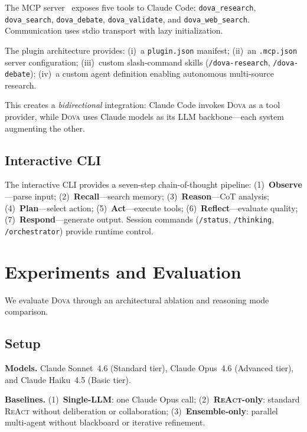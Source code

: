 \documentclass{article}
\theoremstyle{plain}
\theoremstyle{definition}
\newcommand{\dova}{\textsc{Dova}}
\newcommand{\react}{\textsc{ReAct}}
\begin{document}
The MCP server~\citep{anthropic2024mcp} exposes five tools to Claude Code:
\texttt{dova\_research}, \texttt{dova\_search}, \texttt{dova\_debate},
\texttt{dova\_validate}, and \texttt{dova\_web\_search}.  Communication uses
stdio transport with lazy initialization.

The plugin architecture provides:
(i)~a \texttt{plugin.json} manifest;
(ii)~an \texttt{.mcp.json} server configuration;
(iii)~custom slash-command skills (\texttt{/dova-research},
\texttt{/dova-debate});
(iv)~a custom agent definition enabling autonomous multi-source research.

This creates a \emph{bidirectional} integration: Claude Code invokes \dova{}
as a tool provider, while \dova{} uses Claude models as its LLM
backbone---each system augmenting the other.

\subsection{Interactive CLI}\label{sec:cli}

The interactive CLI provides a seven-step chain-of-thought pipeline:
(1)~\textbf{Observe}---parse input;
(2)~\textbf{Recall}---search memory;
(3)~\textbf{Reason}---CoT analysis;
(4)~\textbf{Plan}---select action;
(5)~\textbf{Act}---execute tools;
(6)~\textbf{Reflect}---evaluate quality;
(7)~\textbf{Respond}---generate output.
Session commands (\texttt{/status}, \texttt{/thinking}, \texttt{/orchestrator})
provide runtime control.

\section{Experiments and Evaluation}\label{sec:experiments}

We evaluate \dova{} through an architectural ablation and reasoning mode
comparison.

\subsection{Setup}

\textbf{Models.}\quad
Claude Sonnet~4.6 (Standard tier), Claude Opus~4.6 (Advanced tier),
and Claude Haiku~4.5 (Basic tier).

\textbf{Baselines.}\quad
(1)~\textbf{Single-LLM}: one Claude Opus call;
(2)~\textbf{\react{}-only}: standard \react{} without deliberation or
collaboration;
(3)~\textbf{Ensemble-only}: parallel multi-agent without blackboard or
iterative refinement.
\end{document}
